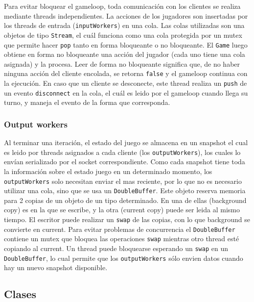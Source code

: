 Para evitar bloquear el gameloop, toda comunicaci\'on con los clientes se realiza mediante threads independientes. La acciones de los jugadores
son insertadas por los threads de entrada (\texttt{inputWorkers}) en una cola. Las colas utilizadas son
una objetos de tipo \texttt{Stream}, el cu\'al funciona como una cola protegida por un mutex que permite
hacer \texttt{pop} tanto en forma bloqueante o no bloqueante. El \texttt{Game} luego obtiene
en forma no bloqueante una acci\'on del jugador (cada uno tiene una cola asignada) y la procesa. Leer de forma
no bloqueante significa que, de no haber ninguna acci\'on del cliente encolada, se retorna \texttt{false} y
el gameloop continua con la ejecuci\'on. En caso que un cliente se desconecte, este thread realiza un \texttt{push}
de un evento \texttt{disconnect} en la cola, el cu\'al es leido por el gameloop cuando llega su turno, y maneja
el evento de la forma que corresponda.


\subsubsection{Output workers}

Al terminar una iteraci\'on, el estado del juego se almacena en un snapshot el cual es leido por threads
asignados a cada cliente (los \texttt{outputWorkers}), los cuales lo env\'ian serializado por el
socket correspondiente. Como cada snapshot tiene toda la informaci\'on sobre el estado juego
en un determinado momento, los \texttt{outputWorkers} solo necesitan enviar el mas reciente, por lo que no
es necesario utilizar una cola, sino que se usa un \texttt{DoubleBuffer}. Este objeto reserva memoria
para 2 copias de un objeto de un tipo determinado. En una de ellas (background copy) es en la que se escribe, y
la otra (current copy) puede ser leida al mismo tiempo. El escritor puede realizar un \texttt{swap} de las copias,
con lo que background se convierte en current. Para evitar problemas de concurrencia el \texttt{DoubleBuffer}
contiene un mutex que bloquea las operaciones \texttt{swap} mientras otro thread est\'e copiando al current.
Un thread puede bloquearse esperando un \texttt{swap} en un \texttt{DoubleBuffer}, lo cual permite que los
\texttt{outputWorkers} s\'olo envien datos cuando hay un nuevo snapshot disponible.

\subsection{Clases}

